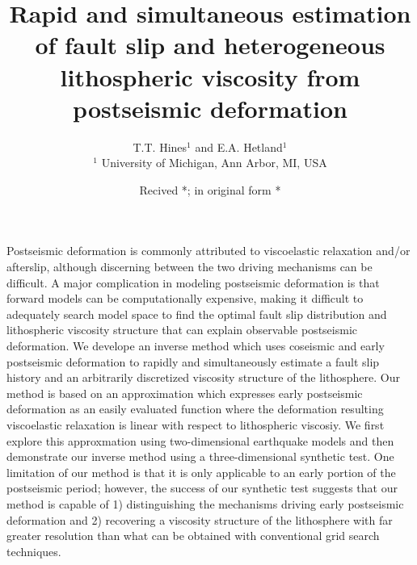 \documentclass[extra,mreferee]{gji}
\title[Estimation of slip and viscosity from postseismic
  deformation]{Rapid and simultaneous estimation of fault slip and
  heterogeneous lithospheric viscosity from postseismic deformation}
\author[T.T. Hines and E.A Hetland]{T.T. Hines$^1$ and
  E.A. Hetland$^1$\\ $^1$ University of Michigan, Ann Arbor, MI, USA}
\date{Recived *; in original form *}
\begin{document}
\label{firstpage}

\maketitle

\begin{summary}
Postseismic deformation is commonly attributed to viscoelastic
relaxation and/or afterslip, although discerning between the two
driving mechanisms can be difficult.  A major complication in modeling
postseismic deformation is that forward models can be computationally
expensive, making it difficult to adequately search model space to
find the optimal fault slip distribution and lithospheric viscosity
structure that can explain observable postseismic deformation.  We
develope an inverse method which uses coseismic and early postseismic
deformation to rapidly and simultaneously estimate a fault slip
history and an arbitrarily discretized viscosity structure of the
lithosphere. Our method is based on an approximation which expresses
early postseismic deformation as an easily evaluated function where
the deformation resulting viscoelastic relaxation is linear with
respect to lithospheric viscosiy.  We first explore this approxmation
using two-dimensional earthquake models and then demonstrate our
inverse method using a three-dimensional synthetic test.  One
limitation of our method is that it is only applicable to an early
portion of the postseismic period; however, the success of our
synthetic test suggests that our method is capable of 1) distinguishing the
mechanisms driving early postseismic deformation and 2) recovering a
viscosity structure of the lithosphere with far greater resolution
than what can be obtained with conventional grid search techniques.


\end{summary}

\begin{keywords}
\end{keywords}
\end{document}
